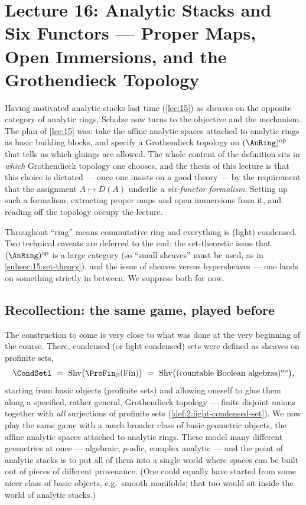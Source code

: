 \section{Lecture 16: Analytic Stacks and Six Functors --- Proper Maps, Open Immersions, and the Grothendieck Topology}
\label{lec:16}

Having motivated analytic stacks last time (\cref{lec:15}) as sheaves on the
opposite category of analytic rings, Scholze now turns to the objective and the
mechanism. The plan of \cref{lec:15} was: take the affine analytic spaces attached
to analytic rings as basic building blocks, and specify a Grothendieck topology on
$(\AnRing)^{\mathrm{op}}$ that tells us which gluings are allowed. The whole content
of the definition sits in \emph{which} Grothendieck topology one chooses, and the
thesis of this lecture is that this choice is dictated --- once one insists on a
good theory --- by the requirement that the assignment $A\mapsto D(A)$ underlie a
\emph{six-functor formalism}. Setting up such a formalism, extracting proper maps
and open immersions from it, and reading off the topology occupy the lecture.

Throughout ``ring'' means commutative ring and everything is (light) condensed.
Two technical caveats are deferred to the end: the set-theoretic issue that
$(\AnRing)^{\mathrm{op}}$ is a large category (so ``small sheaves'' must be used, as
in \cref{subsec:15:set-theory}), and the issue of sheaves versus hypersheaves ---
one lands on something strictly in between. We suppress both for now.

\subsection{Recollection: the same game, played before}
\label{subsec:16:recollection}

\begin{remark}
\label{rmk:16:analogy}
The construction to come is very close to what was done at the very beginning of
the course. There, condensed (or light condensed) sets were defined as sheaves on
profinite sets,
\begin{equation*}
\CondSetl\ =\ \mathrm{Shv}\bigl(\ProFin_{\mathbb{N}}(\mathrm{Fin})\bigr)
\ =\ \mathrm{Shv}\bigl((\text{countable Boolean algebras})^{\mathrm{op}}\bigr),
\end{equation*}
starting from basic objects (profinite sets) and allowing oneself to glue them
along a specified, rather general, Grothendieck topology --- finite disjoint unions
together with \emph{all} surjections of profinite sets (\cref{def:2:light-condensed-set}).
We now play the same game with a much broader class of basic geometric objects, the
affine analytic spaces attached to analytic rings. These model many different
geometries at once --- algebraic, $p$-adic, complex analytic --- and the point of
analytic stacks is to put all of them into a single world where spaces can be built
out of pieces of different provenance. (One could equally have started from some
nicer class of basic objects, e.g.\ smooth manifolds; that too would sit inside the
world of analytic stacks.)
\end{remark}

